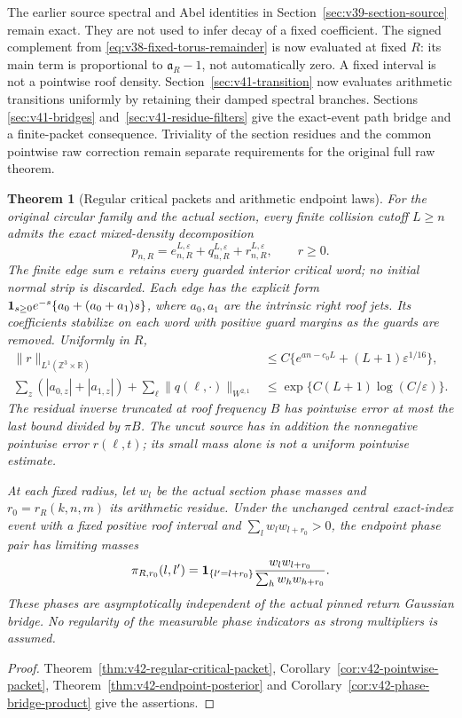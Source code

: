 \documentclass[11pt,reqno]{amsart}
\numberwithin{equation}{section}
\newtheorem{leadtheorem}{Theorem}
\theoremstyle{definition}\newtheorem{definition}[theorem]{Definition}
\theoremstyle{remark}\newtheorem{remark}[theorem]{Remark}
\newcommand{\R}{\mathbb R}\newcommand{\Z}{\mathbb Z}\newcommand{\T}{\mathbb T}
\begin{document}
The earlier source spectral and Abel identities in
Section~\ref{sec:v39-section-source} remain exact. They are not used
to infer decay of a fixed coefficient. The signed complement from
\eqref{eq:v38-fixed-torus-remainder} is now evaluated at fixed $R$:
its main term is proportional to $\mathfrak a_R-1$, not automatically
zero. A fixed interval is not a pointwise roof density. Section~\ref{sec:v41-transition} now evaluates arithmetic transitions
uniformly by retaining their damped spectral branches. Sections~
\ref{sec:v41-bridges} and~\ref{sec:v41-residue-filters} give the
exact-event path bridge and a finite-packet consequence. Triviality of
the section residues and the common pointwise raw correction remain
separate requirements for the original full raw theorem.

\begin{leadtheorem}[Regular critical packets and arithmetic endpoint laws]
\label{thm:intro-v42-critical-packet}
For the original circular family and the actual section, every finite
collision cutoff $L\ge n$ admits the exact mixed-density decomposition
\[
 p_{n,R}=e_{n,R}^{L,\varepsilon}+q_{n,R}^{L,\varepsilon}
                                +r_{n,R}^{L,\varepsilon},\qquad r\ge0.
\]
The finite edge sum $e$ retains every guarded interior critical word;
no initial normal strip is discarded. Each edge has the explicit form
$\mathbf1_{s\ge0}e^{-s}\{a_0+(a_0+a_1)s\}$, where $a_0,a_1$ are the
intrinsic right roof jets. Its coefficients stabilize on each word with positive guard margins
as the guards are removed. Uniformly in $R$,
\begin{align*}
 \|r\|_{L^1(\Z^3\times\R)}
   &\le C\{e^{an-c_0L}+(L+1)\varepsilon^{1/16}\},\\
 \sum_z(|a_{0,z}|+|a_{1,z}|)+\sum_\ell\|q(\ell,\cdot)\|_{W^{2,1}}
   &\le \exp\{C(L+1)\log(C/\varepsilon)\}.
\end{align*}
The residual inverse truncated at roof frequency $B$ has pointwise
error at most the last bound divided by $\pi B$. The uncut source has
in addition the nonnegative pointwise error $r(\ell,t)$; its small
mass alone is not a uniform pointwise estimate.

At each fixed radius, let $w_l$ be the actual section phase masses and
$r_0=r_R(k,n,m)$ its arithmetic residue. Under the unchanged central
exact-index event with a fixed positive roof interval and
$\sum_lw_lw_{l+r_0}>0$, the endpoint phase pair has limiting masses
\[
 \pi_{R,r_0}(l,l')=
 \mathbf1_{\{l'=l+r_0\}}\frac{w_lw_{l+r_0}}{\sum_hw_hw_{h+r_0}}.
\]
These phases are asymptotically independent of the actual pinned return
Gaussian bridge. No regularity of the measurable phase indicators as
strong multipliers is assumed.
\end{leadtheorem}
\begin{proof}
Theorem~\ref{thm:v42-regular-critical-packet},
Corollary~\ref{cor:v42-pointwise-packet},
Theorem~\ref{thm:v42-endpoint-posterior} and
Corollary~\ref{cor:v42-phase-bridge-product} give the assertions.
\end{proof}
\end{document}
